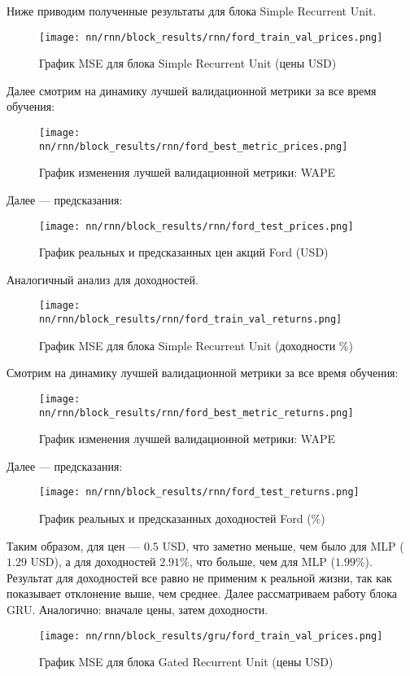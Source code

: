 Ниже приводим полученные результаты для блока Simple Recurrent Unit.
\begin{figure}[H]
	\centering
	\texttt{[image: nn/rnn/block\_results/rnn/ford\_train\_val\_prices.png]}
	\caption{График MSE для блока Simple Recurrent Unit (цены USD)}
	\label{fig::rnn_ford_train_val_prices}
\end{figure}
\noindent Далее смотрим на динамику лучшей валидационной метрики за все время обучения:
\begin{figure}[H]
	\centering
	\texttt{[image: nn/rnn/block\_results/rnn/ford\_best\_metric\_prices.png]}
	\caption{График изменения лучшей валидационной метрики: WAPE}
	\label{fig::rnn_ford_best_metric_prices}
\end{figure}
\noindent Далее --- предсказания:
\begin{figure}[H]
	\centering
	\texttt{[image: nn/rnn/block\_results/rnn/ford\_test\_prices.png]}
	\caption{График реальных и предсказанных цен акций Ford (USD)}
	\label{fig::rnn_ford_test_prices}
\end{figure}
\noindent Аналогичный анализ для доходностей.
\begin{figure}[H]
	\centering
	\texttt{[image: nn/rnn/block\_results/rnn/ford\_train\_val\_returns.png]}
	\caption{График MSE для блока Simple Recurrent Unit (доходности \%)}
	\label{fig::rnn_ford_train_val_returns}
\end{figure}
\noindent Смотрим на динамику лучшей валидационной метрики за все время обучения:
\begin{figure}[H]
	\centering
	\texttt{[image: nn/rnn/block\_results/rnn/ford\_best\_metric\_returns.png]}
	\caption{График изменения лучшей валидационной метрики: WAPE}
	\label{fig::rnn_ford_best_metric_returns}
\end{figure}
\noindent Далее --- предсказания:
\begin{figure}[H]
	\centering
	\texttt{[image: nn/rnn/block\_results/rnn/ford\_test\_returns.png]}
	\caption{График реальных и предсказанных доходностей Ford (\%)}
	\label{fig::rnn_ford_test_returns}
\end{figure}
\noindent Таким образом, для цен --- $0.5$ USD, что заметно меньше, чем было для MLP ($1.29$ USD), а для доходностей $2.91\%$, что больше, чем для MLP ($1.99\%$). Результат для доходностей все равно не применим к реальной жизни, так как показывает отклонение выше, чем среднее. Далее рассматриваем работу блока GRU. Аналогично: вначале цены, затем доходности.
\begin{figure}[H]
	\centering
	\texttt{[image: nn/rnn/block\_results/gru/ford\_train\_val\_prices.png]}
	\caption{График MSE для блока Gated Recurrent Unit (цены USD)}
	\label{fig::gru_ford_train_val_prices}
\end{figure}
